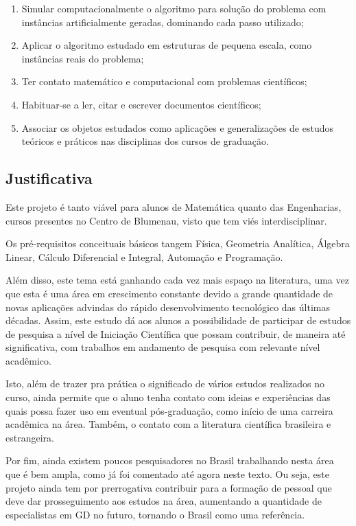 \documentclass[11pt]{article}
\begin{document}
{{\begin{enumerate}[(1)]
\item Simular computacionalmente o algoritmo para solução do problema com instâncias artificialmente geradas, dominando cada passo utilizado;

\item Aplicar o algoritmo estudado em estruturas de pequena escala, como instâncias reais do problema;

\item Ter contato matemático e computacional com problemas científicos;

\item Habituar-se a ler, citar e escrever documentos científicos;

\item Associar os objetos estudados como aplicações e generalizações de estudos teóricos e práticos nas disciplinas dos cursos de graduação.
\end{enumerate}


\subsection{Justificativa}

Este projeto é tanto viável para alunos de Matemática quanto das Engenharias, cursos presentes no Centro de Blumenau, visto que tem viés interdisciplinar.

Os pré-requisitos conceituais básicos tangem Física, Geometria Analítica, Álgebra Linear, Cálculo Diferencial e Integral, Automação e Programação.

Além disso, este tema está ganhando cada vez mais espaço na literatura, uma vez que esta é uma área em crescimento constante devido a grande quantidade de novas aplicações advindas do rápido desenvolvimento tecnológico das últimas décadas. Assim, este estudo dá aos alunos a possibilidade de participar de estudos de pesquisa a nível de Iniciação Científica que possam contribuir, de maneira até significativa, com trabalhos em andamento de pesquisa com relevante nível acadêmico.

Isto, além de trazer pra prática o significado de vários estudos realizados no curso, ainda permite que o aluno tenha contato com ideias e experiências das quais possa fazer uso em eventual pós-graduação, como início de uma carreira acadêmica na área. Também, o contato com a literatura científica brasileira e estrangeira.

Por fim, ainda existem poucos pesquisadores no Brasil trabalhando nesta área que é bem ampla, como já foi comentado até agora neste texto. Ou seja, este projeto ainda tem por prerrogativa contribuir para a formação de pessoal que deve dar prosseguimento aos estudos na área, aumentando a quantidade de especialistas em GD no futuro, tornando o Brasil como uma referência.


}}
\end{document}
